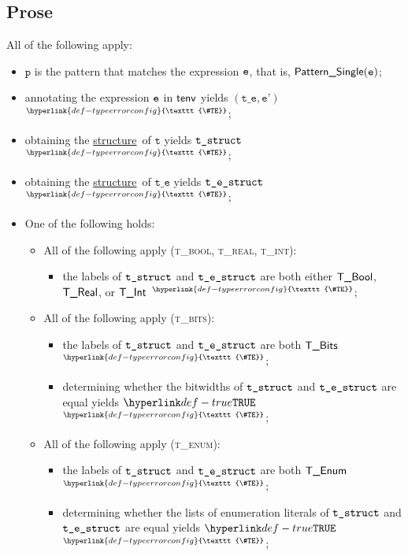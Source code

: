 \documentclass{book}
\newcommand\TypeErrorConfig[0]{\hyperlink{def-typeerrorconfig}{\texttt{\#TE}}}
\newcommand\ProseOrTypeError[0]{\hyperlink{def-proseortypeerror}{$^{\TypeErrorConfig}$}}
\newcommand\structure[0]{\hyperlink{def-structure}{structure}}
\newcommand\vp[0]{\texttt{p}}
\newcommand\vt[0]{\texttt{t}}
\newcommand\vte[0]{\texttt{t\_e}}
\newcommand\vep[0]{\texttt{e'}}
\begin{document}
\subsection{Prose}
All of the following apply:
\begin{itemize}
  \item $\vp$ is the pattern that matches the expression $\texttt{e}$, that is, $\textsf{Pattern\_Single}(\texttt{e})$;
  \item annotating the expression $\texttt{e}$ in $\textsf{tenv}$ yields $(\vte, \vep)$ \ProseOrTypeError;
  \item obtaining the \structure\ of $\vt$ yields $\texttt{t\_struct}$ \ProseOrTypeError;
  \item obtaining the \structure\ of $\vte$ yields $\texttt{t\_e\_struct}$ \ProseOrTypeError;
  \item One of the following holds:
  \begin{itemize}
    \item All of the following apply (\textsc{t\_bool, t\_real, t\_int}):
    \begin{itemize}
      \item the labels of $\texttt{t\_struct}$ and $\texttt{t\_e\_struct}$ are both either $\textsf{T\_Bool}$, $\textsf{T\_Real}$, or $\textsf{T\_Int}$ \ProseOrTypeError;
    \end{itemize}

    \item All of the following apply (\textsc{t\_bits}):
    \begin{itemize}
      \item the labels of $\texttt{t\_struct}$ and $\texttt{t\_e\_struct}$ are both $\textsf{T\_Bits}$ \ProseOrTypeError;
      \item determining whether the bitwidths of $\texttt{t\_struct}$ and $\texttt{t\_e\_struct}$ are equal yields $\True$ \ProseOrTypeError;
    \end{itemize}

    \item All of the following apply (\textsc{t\_enum}):
    \begin{itemize}
      \item the labels of $\texttt{t\_struct}$ and $\texttt{t\_e\_struct}$ are both $\textsf{T\_Enum}$ \ProseOrTypeError;
      \item determining whether the lists of enumeration literals of $\texttt{t\_struct}$ and $\texttt{t\_e\_struct}$ are equal yields $\True$ \ProseOrTypeError;
    \end{itemize}


\end{itemize}
\end{itemize}
\end{document}
